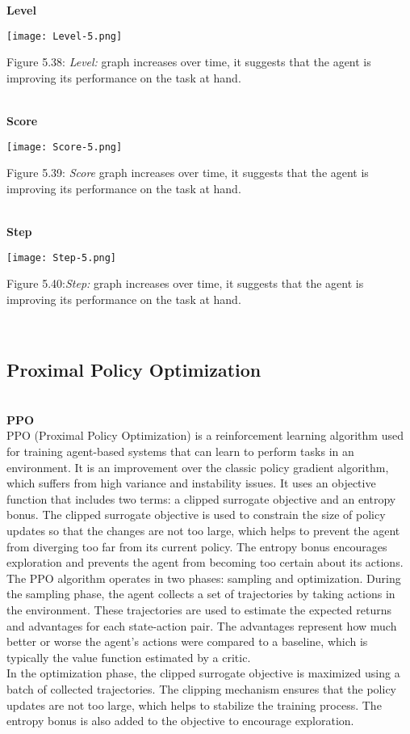 \documentclass[conference]{IEEEtran}
\begin{document}
\textbf{Level}\\

\graphicspath{ {./images/} }
\texttt{[image: Level-5.png]}
\caption{Figure 5.38: \textit{Level:} graph increases over time, it suggests that the agent is improving its performance on the task at hand.
}\\

\textbf{Score}\\

\graphicspath{ {./images/} }
\texttt{[image: Score-5.png]}
\caption{Figure 5.39: \textit{Score }graph increases over time, it suggests that the agent is improving its performance on the task at hand.
}\\

\textbf{Step}\\

\graphicspath{ {./images/} }
\texttt{[image: Step-5.png]}
\caption{Figure 5.40:\textit{Step: }graph increases over time, it suggests that the agent is improving its performance on the task at hand.
}\\

\subsection{Proximal Policy Optimization}\\

\textbf{PPO}\\

PPO (Proximal Policy Optimization) is a reinforcement learning algorithm used for training agent-based systems that can learn to perform tasks in an environment. It is an improvement over the classic policy gradient algorithm, which suffers from high variance and instability issues. It uses an objective function that includes two terms: a clipped surrogate objective and an entropy bonus. The clipped surrogate objective is used to constrain the size of policy updates so that the changes are not too large, which helps to prevent the agent from diverging too far from its current policy. The entropy bonus encourages exploration and prevents the agent from becoming too certain about its actions.\\
The PPO algorithm operates in two phases: sampling and optimization. During the sampling phase, the agent collects a set of trajectories by taking actions in the environment. These trajectories are used to estimate the expected returns and advantages for each state-action pair. The advantages represent how much better or worse the agent's actions were compared to a baseline, which is typically the value function estimated by a critic.\\
In the optimization phase, the clipped surrogate objective is maximized using a batch of collected trajectories. The clipping mechanism ensures that the policy updates are not too large, which helps to stabilize the training process. The entropy bonus is also added to the objective to encourage exploration.\\
\end{document}
